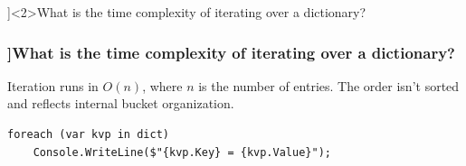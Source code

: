 \QuestionSlide[\CategoryBadge[CollColor!20]{Collections}]<2>{What is the time complexity of iterating over a dictionary?}
\begin{frame}[fragile]
  \frametitle{\AnswerTitle[\CategoryBadge[CollColor!20]{Collections}]{What is the time complexity of iterating over a dictionary?}}

  {\footnotesize
    Iteration runs in \(O(n)\), where \(n\) is the number of entries. The order isn’t sorted and reflects internal bucket organization.
  }

  \begin{verbatim}
foreach (var kvp in dict)
    Console.WriteLine($"{kvp.Key} = {kvp.Value}");
  \end{verbatim}
\end{frame}

